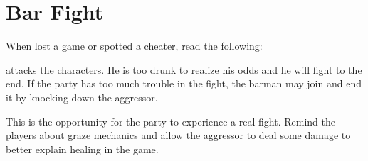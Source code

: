 \section{Bar Fight}
\label{sec:tutorialFightNormal}

When \npcDrunkenSailor{} lost a game or spotted a cheater, read the following:


\enemyDrunkenSailor{} attacks the characters. He is too drunk to realize his odds and he will fight to the end. If the party has too much trouble in the fight, the barman may join and end it by knocking down the aggressor.

This is the opportunity for the party to experience a real fight. Remind the players about graze mechanics and allow the aggressor to deal some damage to better explain healing in the game.
